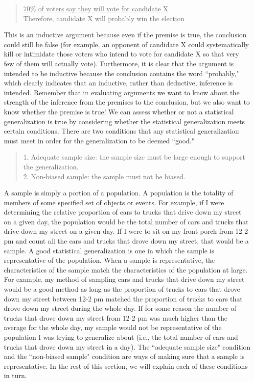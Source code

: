 \begin{quote}
\underline{70\% of voters say they will vote for candidate X} \\
Therefore, candidate X will probably win the election \\
\end{quote}

This is an inductive argument because even if the premise is true, the conclusion
could still be false (for example, an opponent of candidate X could
systematically kill or intimidate those voters who intend to vote for candidate X
so that very few of them will actually vote). Furthermore, it is clear that the
argument is intended to be inductive because the conclusion contains the word
``probably," which clearly indicates that an inductive, rather than deductive,
inference is intended. Remember that in evaluating arguments we want to know
about the strength of the inference from the premises to the conclusion, but we
also want to know whether the premise is true! We can assess whether or not a
statistical generalization is true by considering whether the statistical
generalization meets certain conditions. There are two conditions that any
statistical generalization must meet in order for the generalization to be deemed
``good." 

\begin{quote}
1. Adequate sample size: the sample size must be large enough to
support the generalization. \\
2. Non-biased sample: the sample must not be biased. \\
\end{quote}

A sample is simply a portion of a population. A population is the totality of
members of some specified set of objects or events. For example, if I were
determining the relative proportion of cars to trucks that drive down my street
on a given day, the population would be the total number of cars and trucks that
drive down my street on a given day. If I were to sit on my front porch from 
12-2 pm and count all the cars and trucks that drove down my street, that would be
a sample. A good statistical generalization is one in which the sample is
representative of the population. When a sample is representative, the
characteristics of the sample match the characteristics of the population at large.
For example, my method of sampling cars and trucks that drive down my street
would be a good method as long as the proportion of trucks to cars that drove
down my street between 12-2 pm matched the proportion of trucks to cars that
drove down my street during the whole day. If for some reason the number of
trucks that drove down my street from 12-2 pm was much higher than the
average for the whole day, my sample would not be representative of the
population I was trying to generalize about (i.e., the total number of cars and
trucks that drove down my street in a day). The ``adequate sample size"
condition and the ``non-biased sample" condition are ways of making sure that a
sample is representative. In the rest of this section, we will explain each of these
conditions in turn.

